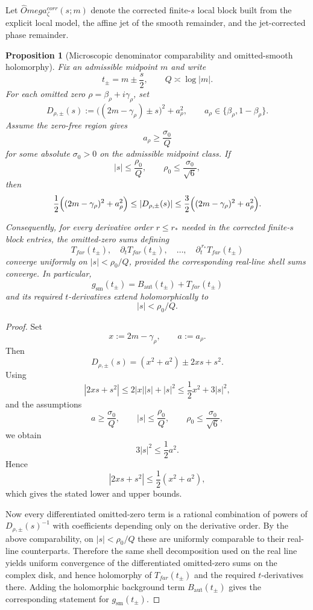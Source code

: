\documentclass[11pt,a4paper]{amsart}
\def\Omega{Omega}%
\def\corr{corr}%
\def\far{far}%
\theoremstyle{plain}
\newtheorem{proposition}[theorem]{Proposition}
\theoremstyle{definition}
\newcommand{\Aut}{\mathrm{aut}}
\newcommand{\sm}{\mathrm{sm}}
\newcommand{\far}{\mathrm{far}}
\newcommand{\corr}{\mathrm{corr}}
\begin{document}
Let $\widehat\Omega_\zeta^{\corr}(s;m)$ denote the corrected finite-$s$ local block built from the explicit local model, the affine jet of the smooth remainder, and the jet-corrected phase remainder.

\begin{proposition}[Microscopic denominator comparability and omitted-smooth holomorphy]
\label{prop:denominator-comparability}
Fix an admissible midpoint $m$ and write
\[
t_\pm=m\pm \frac{s}{2},
\qquad
Q\asymp \log |m|.
\]
For each omitted zero $\rho=\beta_\rho+i\gamma_\rho$, set
\[
D_{\rho,\pm}(s):=\bigl((2m-\gamma_\rho)\pm s\bigr)^2+a_\rho^2,
\qquad
a_\rho\in\{\beta_\rho,1-\beta_\rho\}.
\]
Assume the zero-free region gives
\[
a_\rho\ge \frac{\sigma_0}{Q}
\]
for some absolute $\sigma_0>0$ on the admissible midpoint class. If
\[
|s|\le \frac{\rho_0}{Q},
\qquad
\rho_0\le \frac{\sigma_0}{\sqrt 6},
\]
then
\[
\frac12\Bigl((2m-\gamma_\rho)^2+a_\rho^2\Bigr)
\le
|D_{\rho,\pm}(s)|
\le
\frac32\Bigl((2m-\gamma_\rho)^2+a_\rho^2\Bigr).
\]

Consequently, for every derivative order $r\le r_*$ needed in the corrected
finite-$s$ block entries, the omitted-zero sums defining
\[
T_{\far}(t_\pm),\quad \partial_t T_{\far}(t_\pm),\quad \dots,\quad \partial_t^{\,r_*}T_{\far}(t_\pm)
\]
converge uniformly on $|s|<\rho_0/Q$, provided the corresponding real-line shell
sums converge. In particular,
\[
g_{\sm}(t_\pm)=B_{\Aut}(t_\pm)+T_{\far}(t_\pm)
\]
and its required $t$-derivatives extend holomorphically to
\[
|s|<\rho_0/Q.
\]
\end{proposition}

\begin{proof}
Set
\[
x:=2m-\gamma_\rho,\qquad a:=a_\rho.
\]
Then
\[
D_{\rho,\pm}(s)=(x^2+a^2)\pm 2xs+s^2.
\]
Using
\[
|2xs+s^2|\le 2|x||s|+|s|^2\le \frac12 x^2+3|s|^2,
\]
and the assumptions
\[
a\ge \frac{\sigma_0}{Q},
\qquad
|s|\le \frac{\rho_0}{Q},
\qquad
\rho_0\le \frac{\sigma_0}{\sqrt 6},
\]
we obtain
\[
3|s|^2\le \frac12 a^2.
\]
Hence
\[
|2xs+s^2|
\le
\frac12(x^2+a^2),
\]
which gives the stated lower and upper bounds.

Now every differentiated omitted-zero term is a rational combination of powers of
$D_{\rho,\pm}(s)^{-1}$ with coefficients depending only on the derivative order.
By the above comparability, on $|s|<\rho_0/Q$ these are uniformly comparable to
their real-line counterparts. Therefore the same shell decomposition used on the
real line yields uniform convergence of the differentiated omitted-zero sums on
the complex disk, and hence holomorphy of $T_{\far}(t_\pm)$ and the required
$t$-derivatives there. Adding the holomorphic background term $B_{\Aut}(t_\pm)$
gives the corresponding statement for $g_{\sm}(t_\pm)$.
\end{proof}
\end{document}
